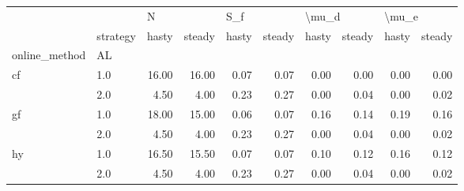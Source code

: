 \begin{tabular}{llrrrrrrrr}
\toprule
   & {} & \multicolumn{2}{l}{N} & \multicolumn{2}{l}{S\_f} & \multicolumn{2}{l}{\textbackslash mu\_d} & \multicolumn{2}{l}{\textbackslash mu\_e} \\
   & strategy & hasty & steady & hasty & steady & hasty & steady & hasty & steady \\
online\_method & AL &       &        &       &        &       &        &       &        \\
\midrule
cf & 1.0 & 16.00 &  16.00 &  0.07 &   0.07 &  0.00 &   0.00 &  0.00 &   0.00 \\
   & 2.0 &  4.50 &   4.00 &  0.23 &   0.27 &  0.00 &   0.04 &  0.00 &   0.02 \\
gf & 1.0 & 18.00 &  15.00 &  0.06 &   0.07 &  0.16 &   0.14 &  0.19 &   0.16 \\
   & 2.0 &  4.50 &   4.00 &  0.23 &   0.27 &  0.00 &   0.04 &  0.00 &   0.02 \\
hy & 1.0 & 16.50 &  15.50 &  0.07 &   0.07 &  0.10 &   0.12 &  0.16 &   0.12 \\
   & 2.0 &  4.50 &   4.00 &  0.23 &   0.27 &  0.00 &   0.04 &  0.00 &   0.02 \\
\bottomrule
\end{tabular}

